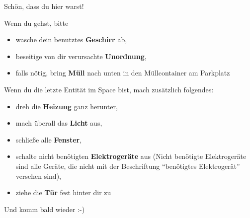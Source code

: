 \documentclass[a4paper,12pt]{article}
\renewcommand{\emph}[1]{\textbf{\huge #1}}
\begin{document}
\LARGE

Schön, dass du hier warst!

Wenn du gehst, bitte
\begin{itemize}
  \item wasche dein benutztes \emph{Geschirr} ab,
  \item beseitige von dir verursachte \emph{Unordnung},
  \item falls nötig, bring \emph{Müll} nach unten in den Müllcontainer am
    Parkplatz
\end{itemize}

Wenn du die letzte Entität im Space bist, mach zusätzlich folgendes:

\begin{itemize}
  \item dreh die \emph{Heizung} ganz herunter,
  \item mach überall das \emph{Licht} aus,
  \item schließe alle \emph{Fenster},
  \item schalte nicht benötigten \emph{Elektrogeräte} aus
    {\large (Nicht benötigte Elektrogeräte sind alle Geräte, die nicht mit der
    Beschriftung "`benötigtes Elektrogerät"' versehen sind)},
  \item ziehe die \emph{Tür} fest hinter dir zu
\end{itemize}

Und komm bald wieder :-)
\end{document}
